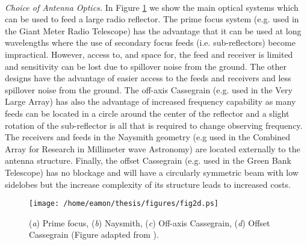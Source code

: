 \\
\textit{Choice of Antenna Optics.} In Figure \ref{fig2d} we show the main optical systems which can be used to feed a large radio reflector. The prime focus system (e.g. used in the Giant Meter Radio Telescope) has the advantage that it can be used at long wavelengths where the use of secondary focus feeds (i.e. sub-reflectors) become impractical. However, access to, and space for, the feed and receiver is limited and sensitivity can be lost due to spillover noise from the ground. The other designs have the advantage of easier access to the feeds and receivers and less spillover noise from the ground. The off-axis Cassegrain (e.g. used in the Very Large Array) has also the advantage of increased frequency capability as many feeds can be located in a circle around the center of the reflector and a slight rotation of the sub-reflector is all that is required to change observing frequency. The receivers and feeds in the Naysmith geometry (e.g used in the Combined Array for Research in Millimeter wave Astronomy) are located externally to the antenna structure. Finally, the offset Cassegrain (e.g. used in the Green Bank Telescope) has no blockage and will have a circularly symmetric beam with low sidelobes but the increase complexity of its structure leads to increased costs. 

\begin{figure}[hbt!]
\centering 
          \texttt{[image: /home/eamon/thesis/figures/fig2d.ps]}
\caption[Common optical systems used for radio antennas.]{(\textit{a}) Prime focus, (\textit{b}) Naysmith, (\textit{c}) Off-axis Cassegrain, (\textit{d}) Offset Cassegrain (Figure adapted from \cite{taylor_1999}).}
\label{fig2d}
\end{figure}

